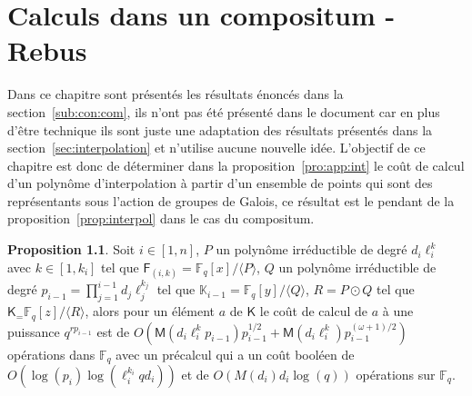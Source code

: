 \documentclass[10pt,a4paper]{book}
\theoremstyle{plain}
\theoremstyle{definition}
\theoremstyle{definition}
\theoremstyle{definition}
\newtheorem{prop}[thm]{Proposition}
\theoremstyle{definition}
\theoremstyle{remark}
\theoremstyle{remark}
\theoremstyle{definition}
\begin{document}
\chapter{Calculs dans un compositum - Rebus}
\label{cha:ann:comp}
Dans ce chapitre sont présentés les résultats énoncés dans la 
section~\ref{sub:con:com}, ils n'ont pas été présenté dans le document car en 
plus d'être technique ils sont juste une adaptation des résultats présentés 
dans la section~\ref{sec:interpolation} et n'utilise aucune nouvelle idée. 
L'objectif de ce chapitre est donc de déterminer dans la 
proposition~\ref{pro:app:int} le coût de calcul d'un polynôme d'interpolation à
partir d'un ensemble de points qui sont des représentants sous l'action de 
groupes de Galois, ce résultat est le pendant de la 
proposition~\ref{prop:interpol} dans le cas du compositum.
\begin{prop}

Soit $i \in [1,n]$, $P$ un polynôme irréductible de degré $d_i\ell_i^{k}$ avec 
$k \in [1,k_i]$ tel que $\mathsf{F}_{(i,k)}=\mathbb{F}_q[x]/\langle P \rangle$,
$Q$ un polynôme irréductible de degré $p_{i-1}=\prod_{j=1}^{i-1}d_j\ell_j^{k_j}$
tel que $\mathbb{K}_{i-1}=\mathbb{F}_q[y]/\langle Q \rangle$, $R=P \odot Q$ 
tel que  $\mathsf{K}_=\mathbb{F}_q[z]/\langle R\rangle$, alors pour un 
élément $a$ de $\mathsf{K}$ le coût de calcul de $a$ à une puissance 
$q^{r p_{i-1}}$ est de 
$O(\mathsf{M}(d_i\ell_i^{k}p_{i-1})p_{i-1}^{1/2}+\mathsf{M}(d_i\ell_i^{k})p_{i-1}^{(\omega+1)/2})$ 
opérations dans $\mathbb{F}_q$ avec un 
précalcul qui a un coût booléen de $O(\log(p_{i})\log(\ell_i^{k_i}qd_i))$ et  
de $O( M(d_i) d_i\log(q))$ opérations sur $\mathbb{F}_q$.
\end{prop}
\end{document}
